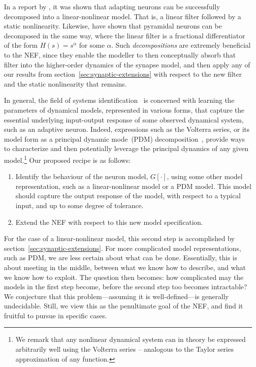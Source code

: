 In a report by \citet{hunsberger2016}, it was shown that adapting neurons can be successfully decomposed into a linear-nonlinear model.
That is, a linear filter followed by a static nonlinearity.
Likewise, \citet{lundstrom2008fractional} have shown that pyramidal neurons can be decomposed in the same way, where the linear filter is a fractional differentiator of the form $H(s) = s^\alpha$ for some $\alpha$.
Such \emph{decompositions} are extremely beneficial to the NEF, since they enable the modeller to then conceptually absorb that filter into the higher-order dynamics of the synapse model, and then apply any of our results from section~\ref{sec:synaptic-extensions} with respect to the new filter and the static nonlinearity that remains.

In general, the field of systems identification~\citep{nelles2013nonlinear} is concerned with learning the parameters of dynamical models, represented in various forms, that capture the essential underlying input-output response of some observed dynamical system, such as an adaptive neuron.
Indeed, expressions such as the Volterra series, or its model form as a principal dynamic mode~(PDM) decomposition~\citep{eikenberry2015principal}, provide ways to characterize and then potentially leverage the principal dynamics of any given model.\footnote{%
We remark that any nonlinear dynamical system can in theory be expressed arbitrarily well using the Volterra series -- analogous to the Taylor series approximation of any function.}
Our proposed recipe is as follows: 
\begin{enumerate}
\item Identify the behaviour of the neuron model, $G\left[ \cdot \right]$, using some other model representation, such as a linear-nonlinear model or a PDM model. This model should capture the output response of the model, with respect to a typical input, and up to some degree of tolerance.
\item Extend the NEF with respect to this new model specification.
\end{enumerate}
For the case of a linear-nonlinear model, this second step is accomplished by section~\ref{sec:synaptic-extensions}.
For more complicated model representations, such as PDM, we are less certain about what can be done.
Essentially, this is about meeting in the middle, between what we know how to describe, and what we know how to exploit.
The question then becomes: how complicated may the models in the first step become, before the second step too becomes intractable?
We conjecture that this problem---assuming it is well-defined---is generally undecidable.
Still, we view this as the penultimate goal of the NEF, and find it fruitful to pursue in specific cases.

